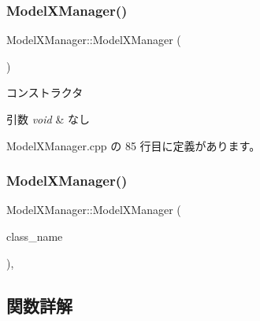 \subsubsection{\texorpdfstring{Model\+X\+Manager()}{ModelXManager()}\hspace{0.1cm}{\footnotesize\ttfamily [1/2]}}
{\footnotesize\ttfamily Model\+X\+Manager\+::\+Model\+X\+Manager (\begin{DoxyParamCaption}{ }\end{DoxyParamCaption})\hspace{0.3cm}{\ttfamily [private]}}



コンストラクタ 


\begin{DoxyParams}{引数}
{\em void} & なし \\
\hline
\end{DoxyParams}


 Model\+X\+Manager.\+cpp の 85 行目に定義があります。

\mbox{\label{class_model_x_manager_a6df03f9aef72a490b755955e70f12685}} 
\subsubsection{\texorpdfstring{Model\+X\+Manager()}{ModelXManager()}\hspace{0.1cm}{\footnotesize\ttfamily [2/2]}}
{\footnotesize\ttfamily Model\+X\+Manager\+::\+Model\+X\+Manager (\begin{DoxyParamCaption}\item[{const \mbox{\hyperlink{class_model_x_manager}{Model\+X\+Manager}} \&}]{class\+\_\+name }\end{DoxyParamCaption})\hspace{0.3cm}{\ttfamily [private]}, {\ttfamily [delete]}}



\subsection{関数詳解}
\mbox{\label{class_model_x_manager_a7c152c72ec36cb12a6ae2007f84c6405}} 
